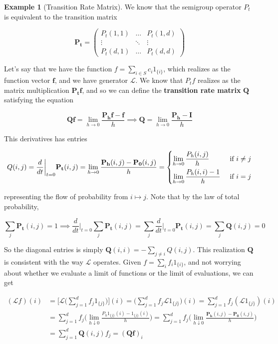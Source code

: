 \documentclass{article}
\theoremstyle{definition}
\newtheorem{example}{Example}[section]
\theoremstyle{remark}
\theoremstyle{definition}
\begin{document}
    \begin{example}[Transition Rate Matrix]
      We know that the semigroup operator $P_t$ is equivalent to the transition matrix 

        \[\mathbf{P_t} = \begin{pmatrix} P_t (1, 1) & \ldots & P_t (1, d) \\ \vdots & \ddots & \vdots \\ P_t (d, 1) & \ldots & P_t (d, d) \end{pmatrix}\]

      Let's say that we have the function $f = \sum_{i \in S} c_i 1_{\{i\}}$, which realizes as the function vector $\mathbf{f}$, and we have generator $\mathscr{L}$. We know that $P_t f$ realizes as the matrix multiplication $\mathbf{P_t} \mathbf{f}$, and so we can define the \textbf{transition rate matrix} $\mathbf{Q}$ satisfying the equation 

        \[\mathbf{Q} \mathbf{f}= \lim_{h \rightarrow 0} \frac{\mathbf{P_h} \mathbf{f} - \mathbf{f}}{h} \implies \mathbf{Q} = \lim_{h \rightarrow 0} \frac{\mathbf{P_h} - \mathbf{I}}{h}\]

      This derivatives has entries 

        \[Q(i, j) = \frac{d}{dt} \bigg|_{t = 0} \mathbf{P_t} (i, j) = \lim_{h \rightarrow 0} \frac{\mathbf{P_h} (i, j) - \mathbf{P_0} (i, j)}{h} = \begin{dcases} \lim_{h \rightarrow 0} \frac{P_h (i, j)}{h} & \text{ if } i \neq j \\ \lim_{h \rightarrow 0} \frac{P_h (i, i) - 1}{h} & \text{ if } i = j \end{dcases}\]

      representing the flow of probability from $i \mapsto j$. Note that by the law of total probability, 

        \[\sum_j \mathbf{P_t} (i, j) = 1 \implies \frac{d}{dt} \bigg|_{t = 0} \sum_{j} \mathbf{P_t} (i, j) =  \sum_j \frac{d}{dt} \bigg|_{t = 0} \mathbf{P_t} (i, j) = \sum_{j} \mathbf{Q} (i, j) = 0\]

      So the diagonal entries is simply $\mathbf{Q}(i, i) = - \sum_{j \neq i} Q(i, j)$. This realization $\mathbf{Q}$ is consistent with the way $\mathscr{L}$ operates. Given $f = \sum_i f_i 1_{\{i\}}$, and not worrying about whether we evaluate a limit of functions or the limit of evaluations, we can get 

      \begin{align*}
        (\mathscr{L} f) (i) & = \bigg[ \mathscr{L} \bigg( \sum_{j=1}^d f_j 1_{\{j\}} \bigg) \bigg] (i) = \bigg( \sum_{j=1}^d f_j \mathscr{L} 1_{\{j\}} \bigg) (i) = \sum_{j=1}^d f_j ( \mathscr{L} 1_{\{j\}}) (i) \\ 
        & = \sum_{j=1}^d f_j \bigg( \lim_{h \downarrow 0} \frac{P_h 1_{\{ j\}} (i) - 1_{\{j\}} (i)}{h} \bigg) = \sum_{j=1}^d f_j \bigg( \lim_{h \downarrow 0} \frac{\mathbf{P_h} (i, j) - \mathbf{P_0} (i, j)}{h} \bigg) \\
        & = \sum_{j=1}^d \mathbf{Q}(i, j) f_j = (\mathbf{Q} \mathbf{f})_i 
      \end{align*}


\end{example}
\end{document}
